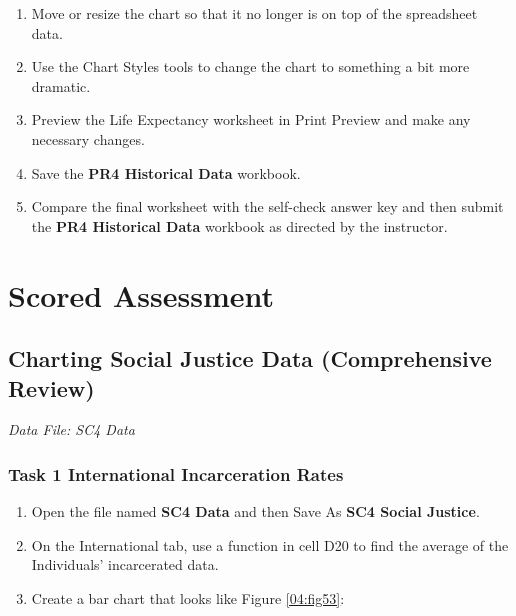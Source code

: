 \begin{enumerate}[resume]
	\item Move or resize the chart so that it no longer is on top of the spreadsheet data.
	\item Use the Chart Styles tools to change the chart to something a bit more dramatic.
	\item Preview the Life Expectancy worksheet in Print Preview and make any necessary changes.
	\item Save the \textbf{PR4 Historical Data} workbook.
	\item Compare the final worksheet with the self-check answer key and then submit the \textbf{PR4 Historical Data} workbook as directed by the instructor.
\end{enumerate}

\section{Scored Assessment}

\subsection{Charting Social Justice Data (Comprehensive Review)}

\textit{Data File: SC4 Data}

\subsubsection{Task 1 International Incarceration Rates}

\begin{enumerate}
	\item Open the file named \textbf{SC4 Data} and then Save As \textbf{SC4 Social Justice}.
	\item On the International tab, use a function in cell \textsf{D20} to find the average of the Individuals' incarcerated data.
	\item Create a bar chart that looks like Figure \ref{04:fig53}:
\end{enumerate}


